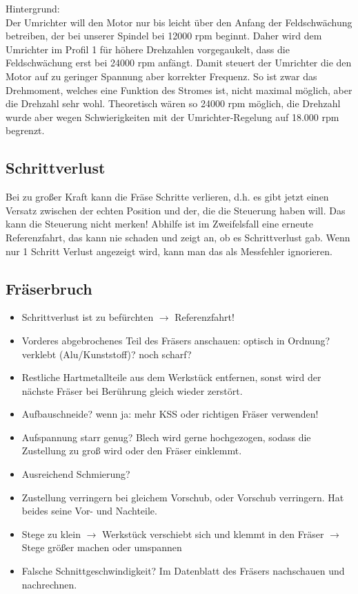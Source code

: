 \documentclass{\basedir/fablab-document}
\begin{document}
Hintergrund:\\
Der Umrichter will den Motor nur bis leicht über den Anfang der Feldschwächung betreiben, der bei unserer Spindel bei 12000 rpm beginnt. Daher wird dem Umrichter im Profil 1 für höhere Drehzahlen vorgegaukelt, dass die Feldschwächung erst bei 24000 rpm anfängt. Damit steuert der Umrichter die den Motor auf zu geringer Spannung aber korrekter Frequenz. So ist zwar das Drehmoment, welches eine Funktion des Stromes ist, nicht maximal möglich, aber die Drehzahl sehr wohl. Theoretisch wären so 24000 rpm möglich, die Drehzahl wurde aber wegen Schwierigkeiten mit der Umrichter-Regelung auf 18.000 rpm begrenzt.

\subsection{Schrittverlust}
Bei zu großer Kraft kann die Fräse Schritte verlieren, d.h. es gibt jetzt einen Versatz zwischen der echten Position und der, die die Steuerung haben will. Das kann die Steuerung nicht merken! Abhilfe ist im Zweifelsfall eine erneute Referenzfahrt, das kann nie schaden und zeigt an, ob es Schrittverlust gab. Wenn nur 1 Schritt Verlust angezeigt wird, kann man das als Messfehler ignorieren.

\subsection{Fräserbruch}
\begin{itemize}
 \item Schrittverlust ist zu befürchten $\rightarrow$ Referenzfahrt!
 \item Vorderes abgebrochenes Teil des Fräsers anschauen: optisch in Ordnung? verklebt (Alu/Kunststoff)? noch scharf?
 \item Restliche Hartmetallteile aus dem Werkstück entfernen, sonst wird der nächste Fräser bei Berührung gleich wieder zerstört.
 \item Aufbauschneide? wenn ja: mehr KSS oder richtigen Fräser verwenden!
 \item Aufspannung starr genug? Blech wird gerne hochgezogen, sodass die Zustellung zu groß wird oder den Fräser einklemmt.
 \item Ausreichend Schmierung?
 \item Zustellung verringern bei gleichem Vorschub, oder Vorschub verringern. Hat beides seine Vor- und Nachteile.
 \item Stege zu klein $\rightarrow$ Werkstück verschiebt sich und klemmt in den Fräser $\rightarrow$ Stege größer machen oder umspannen
 \item Falsche Schnittgeschwindigkeit? Im Datenblatt des Fräsers nachschauen und nachrechnen.
 \end{itemize}
\end{document}
